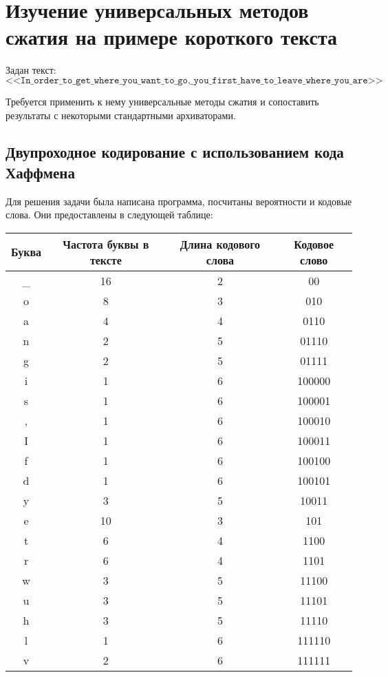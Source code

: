 \section{Изучение универсальных методов сжатия на примере короткого текста}
Задан текст: 
\begin{equation}
    \texttt{<<In\_order\_to\_get\_where\_you\_want\_to\_go,\_you\_first\_have\_to\_leave\_where\_you\_are>>}
\end{equation}

Требуется применить к нему универсальные методы сжатия и сопоставить результаты с некоторыми стандартными архиваторами.

\subsection{Двупроходное кодирование с использованием кода Хаффмена}
Для решения задачи была написана программа, посчитаны вероятности и кодовые слова. Они предоставлены в следующей таблице:

\renewcommand\arraystretch{1.0}
\begin{center}
    \begin{longtable}{|c|c|c|c|}
        \hline
        Буква&Частота буквы в тексте&Длина кодового слова&Кодовое слово \\
        \hline  \_&16&2&00\\  \hline o&8&3&010\\  \hline a&4&4&0110\\  \hline n&2&5&01110\\  \hline g&2&5&01111\\  \hline i&1&6&100000\\  \hline s&1&6&100001\\  \hline ,&1&6&100010\\  \hline I&1&6&100011\\  \hline f&1&6&100100\\  \hline d&1&6&100101\\  \hline y&3&5&10011\\  \hline e&10&3&101\\  \hline t&6&4&1100\\  \hline r&6&4&1101\\  \hline w&3&5&11100\\  \hline u&3&5&11101\\  \hline h&3&5&11110\\  \hline l&1&6&111110\\  \hline v&2&6&111111\\  \hline
    \end{longtable}
\end{center}


